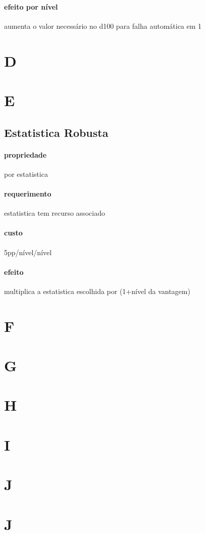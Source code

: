 \paragraph{efeito por nível} aumenta o valor necessário no d100 para falha automática em 1
\section{D}
\section{E}
\subsection{Estatistica Robusta}
\paragraph{propriedade} por estatistica
\paragraph{requerimento} estatistica tem recurso associado
\paragraph{custo} 5pp/nível/nível
\paragraph{efeito} multiplica a estatistica escolhida por (1+nível da vantagem)
\section{F}
\section{G}
\section{H}
\section{I}
\section{J}
\section{J}
